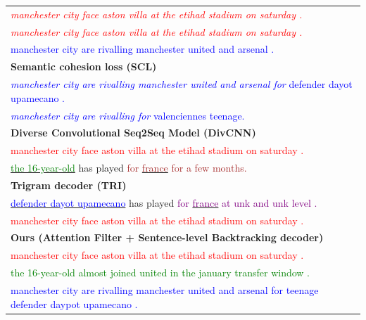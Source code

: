 \begin{table}[th!]
\begin{center}
\begin{tabular}{|p{13cm}|}
\hline \textcolor{red}{\textit{manchester city face aston villa at the etihad stadium on saturday .}} \\
      \textcolor{red}{\textit{manchester city face aston villa at the etihad stadium on saturday .}} \\
	   \textcolor{blue}{manchester city are rivalling manchester united and arsenal .}\\
\hline \bf Semantic cohesion loss (SCL) \\
\hline \textcolor{blue}{\textit{manchester city are rivalling manchester united and arsenal for} defender dayot upamecano .}\\
       \textcolor{blue}{\textit{manchester city are rivalling for} valenciennes teenage.} \\
\hline \bf Diverse Convolutional Seq2Seq  Model (DivCNN) \\
\hline \textcolor{red}{manchester city face aston villa at the etihad stadium on saturday . } \\
\underline{\textcolor{green}{the 16-year-old}} has played \textcolor{brown}{for} \underline{\textcolor{brown}{france}}  \textcolor{brown}{for a few months.}
\vspace{0.2mm} \\
\hline \bf Trigram decoder (TRI) \\
\hline \underline{\textcolor{blue}{defender dayot upamecano}} has played \textcolor{purple}{for} \underline{\textcolor{purple}{france}} \textcolor{purple}{at unk and unk level .}\\ 
       \textcolor{red}{manchester city face aston villa at the etihad stadium on saturday .} \\
\hline \bf Ours (Attention Filter + Sentence-level Backtracking decoder) \\
\hline \textcolor{red}{manchester city face aston villa at the etihad stadium on saturday .} \\
       \textcolor{green}{the 16-year-old almost joined united in the january transfer window .}\\
	   \textcolor{blue}{manchester city are rivalling manchester united and arsenal for teenage defender daypot upamecano .}\\
\hline
\end{tabular}
\end{center}
\end{table}

